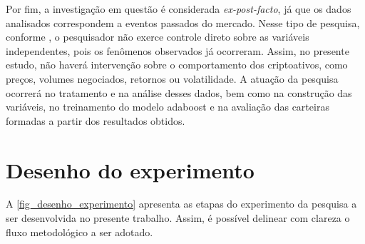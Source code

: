 Por fim, a investigação em questão é considerada \textit{ex-post-facto}, já que os dados analisados correspondem a eventos passados do mercado. Nesse tipo de pesquisa, conforme , o pesquisador não exerce controle direto sobre as variáveis independentes, pois os fenômenos observados já ocorreram. Assim, no presente estudo, não haverá intervenção sobre o comportamento dos criptoativos, como preços, volumes negociados, retornos ou volatilidade. A atuação da pesquisa ocorrerá no tratamento e na análise desses dados, bem como na construção das variáveis, no treinamento do modelo \acs{adaboost} e na avaliação das carteiras formadas a partir dos resultados obtidos.

\section{Desenho do experimento}
\label{sec_desenho_do_experimento}

A \autoref{fig_desenho_experimento} apresenta as etapas do experimento da pesquisa a ser desenvolvida no presente trabalho. Assim, é possível delinear com clareza o fluxo metodológico a ser adotado.

